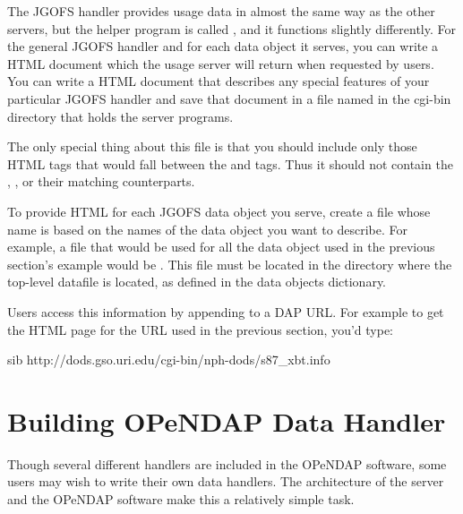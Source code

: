 \documentclass{dods-book}
\begin{document}
The JGOFS handler provides usage data in almost the same way as the
other servers, but the  helper program is called
, and it functions slightly differently. For the general
JGOFS handler and for each data object it serves, you can write a HTML
document which the usage server will return when requested by users.
You can write a HTML document that describes any special  features of your particular JGOFS
handler and save that document in a file named  in the
cgi-bin directory that holds the server programs.


The only special thing about this file is that you should include only
those HTML tags that would fall between the  and
 tags.  Thus it should not contain the ,
,  or their matching counterparts.

To provide HTML for each JGOFS data object you serve, create a file
whose name is based on the names of the data object you want to
describe.  For example, a file that would be used for all the
 data object used in the previous section's example would
be . This file must be located in the directory
where the top-level datafile is located, as defined in the data
objects dictionary.

Users access this information by appending  to a DAP URL.
For example to get the HTML page for the URL used in the previous
section, you'd type:

\begin{vcode}{sib}
http://dods.gso.uri.edu/cgi-bin/nph-dods/s87_xbt.info  
\end{vcode}
   


\chapter{Building OPeNDAP Data Handler}
\label{dods-server,building}

Though several different handlers are included in the OPeNDAP
software, some users may wish to write their own data handlers. The
architecture of the  server and the OPeNDAP software make
this a relatively simple task.
\end{document}
